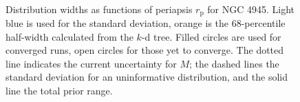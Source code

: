 \documentclass[useAMS,usedcolumn,usegraphicx,usenatbib]{mn2e}
\newcommand{\sub}[1]{\ensuremath{_\mathrm{#1}}}
\begin{document}
\begin{figure}
\begin{center}
 \quad
{} \\
\caption{Distribution widths as functions of periapsis $r\sub{p}$ for NGC 4945. Light blue is used for the standard deviation, orange is the $68$-percentile half-width calculated from the $k$-d tree. Filled circles are used for converged runs, open circles for those yet to converge. The dotted line indicates the current uncertainty for $M$; the dashed lines the standard deviation for an uninformative distribution, and the solid line the total prior range.}
\end{center}
\end{figure}
\end{document}
